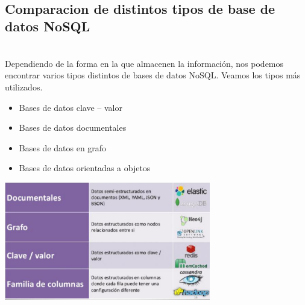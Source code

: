 \documentclass[twoside,onecolumn]{article}
\begin{document}
\begin{flushright}
\begin{itemize}
\textbf{}\\
\subsection{Comparacion de distintos tipos de base de datos NoSQL}
\textbf{}\\Dependiendo de la forma en la que almacenen la información, nos podemos encontrar varios tipos
distintos de bases de datos NoSQL. Veamos los tipos más utilizados.
 \begin{itemize}
		\item Bases de datos clave – valor
                     \item Bases de datos documentales
		\item Bases de datos en grafo
		\item Bases de datos orientadas a objetos
	           \end{itemize}
\begin{center}
		\includegraphics[width=9cm]{./Imagenes/7}
		\end{center}	
\textbf{}\\

\end{itemize}
\end{flushright}
\end{document}
